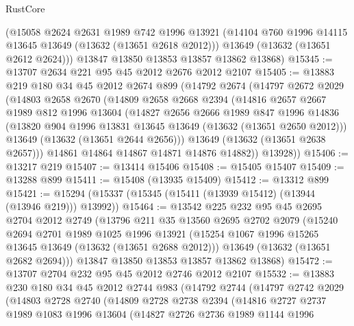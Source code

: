 \begin{lexlean}{RustCore}
\begin{coremodule}
      (@15058
        @2624
        @2631
        @1989
        @742
        @1996
        @13921
        (@14104 @760 @1996 @14115 @13645 @13649 (@13632 (@13651 @2618 @2012)))
        @13649
        (@13632 (@13651 @2612 @2624)))
      @13847
      @13850
      @13853
      @13857
      @13862
      @13868)
@15345 := @13707 @2634 @221 @95 @45 @2012 @2676 @2012 @2107
@15405 := @13883
    @219
    @180
    @34
    @45
    @2012
    @2674
    @899
    (@14792
      @2674
      (@14797
        @2672
        @2029
        (@14803
          @2658
          @2670
          (@14809
            @2658
            @2668
            @2394
            (@14816
              @2657
              @2667
              @1989
              @812
              @1996
              @13604
              (@14827
                @2656
                @2666
                @1989
                @847
                @1996
                @14836
                (@13820 @904 @1996 @13831 @13645 @13649 (@13632 (@13651 @2650 @2012)))
                @13649
                (@13632 (@13651 @2644 @2656)))
              @13649
              (@13632 (@13651 @2638 @2657)))
            @14861
            @14864
            @14867
            @14871
            @14876
            @14882))
        @13928))
@15406 := @13217 @219
@15407 := @13414 @15406
@15408 := @15405 @15407
@15409 := @13288 @899
@15411 := @15408 (@13935 @15409)
@15412 := @13312 @899
@15421 := @15294 (@15337 (@15345 (@15411 (@13939 @15412) (@13944 (@13946 @219))) @13992))
@15464 := @13542
    @225
    @232
    @95
    @45
    @2695
    @2704
    @2012
    @2749
    (@13796
      @211
      @35
      @13560
      @2695
      @2702
      @2079
      (@15240
        @2694
        @2701
        @1989
        @1025
        @1996
        @13921
        (@15254 @1067 @1996 @15265 @13645 @13649 (@13632 (@13651 @2688 @2012)))
        @13649
        (@13632 (@13651 @2682 @2694)))
      @13847
      @13850
      @13853
      @13857
      @13862
      @13868)
@15472 := @13707 @2704 @232 @95 @45 @2012 @2746 @2012 @2107
@15532 := @13883
    @230
    @180
    @34
    @45
    @2012
    @2744
    @983
    (@14792
      @2744
      (@14797
        @2742
        @2029
        (@14803
          @2728
          @2740
          (@14809
            @2728
            @2738
            @2394
            (@14816
              @2727
              @2737
              @1989
              @1083
              @1996
              @13604
              (@14827
                @2726
                @2736
                @1989
                @1144
                @1996

\end{coremodule}
\end{lexlean}
